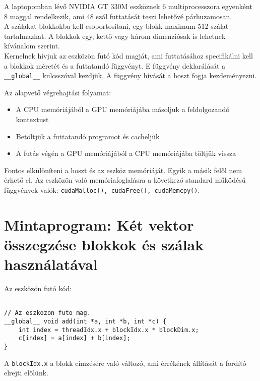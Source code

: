 A laptopomban lévő NVIDIA GT 330M eszköznek 6 multiprocesszora egyenként 8 maggal
rendelkezik, ami 48 szál futtatását teszi lehetővé párhuzamosan.
\\

\noindent A szálakat blokkokba kell csoportosítani, egy blokk maximum 512 szálat tartalmazhat.
A blokkok egy, kettő vagy három dimenziósak is lehetnek kívánalom szerint.
\\

\noindent Kernelnek hívjuk az eszközön futó kód magját, ami futtatásához specifikálni kell
a blokkok méretét és a futtatandó függvényt.
E függvény deklarálását a \texttt{\_\_global\_\_} kulcsszóval kezdjük.
A függvény hívását a hoszt fogja kezdeményezni.

\noindent Az alapvető végrehajtási folyamat:
\begin{itemize}
\item A CPU memóriájából a GPU memóriájába másoljuk a feldolgozandó kontextust
\item Betöltjük a futtatandó programot és cacheljük
\item A futás végén a GPU memóriájából a CPU memóriájába töltjük vissza
\end{itemize}
Fontos elkülöníteni a hoszt és az eszköz memóriáját. Egyik a másik felől nem érhető el.
Az eszközön való memóriafoglalásra a következő standard működésű függvények valók:
\texttt{cudaMalloc(), cudaFree(), cudaMemcpy()}.
\newpage

\section{Mintaprogram: Két vektor összegzése blokkok és szálak használatával}

Az eszközön futó kód:
\begin{lstlisting}[frame=single]  % Start your code-block

// Az eszkozon futo mag.
__global__ void add(int *a, int *b, int *c) {
    int index = threadIdx.x + blockIdx.x * blockDim.x;
    c[index] = a[index] + b[index];
}
\end{lstlisting}
A \texttt{blockIdx.x} a blokk címzésére való változó, ami érrékének állítását a fordító elrejti előlünk.

